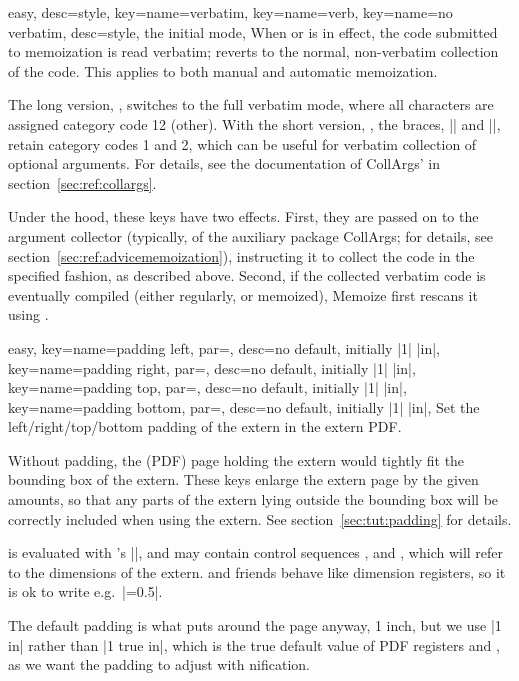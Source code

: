 \documentclass[a4paper,11pt]{article}
\begin{document}
\begin{doc}{easy,
    desc={style},
    key={name=verbatim},
    key={name=verb},
    key={name=no verbatim, desc={style, the initial mode}},
  }
  When  or  is in effect, the code submitted to
  memoization is read verbatim;  reverts to the normal,
  non-verbatim collection of the code.  This applies to both manual and
  automatic memoization.
  
  The long version, , switches to the full verbatim mode,
  where all characters are assigned category code 12 (other).  With the short
  version, , the braces, |{| and |}|, retain category codes 1 and
  2, which can be useful for verbatim collection of optional arguments.  For
  details, see the documentation of CollArgs'  in
  section~\ref{sec:ref:collargs}.

  Under the hood, these keys have two effects. First, they are passed on to the
  argument collector (typically,  of the auxiliary
  package CollArgs; for details, see section~\ref{sec:ref:advicememoization}),
  instructing it to collect the code in the specified fashion, as described
  above.  Second, if the collected verbatim code is eventually compiled (either
  regularly, or memoized), Memoize first rescans it using .
\end{doc}

\begin{doc}{easy,
    key={name=padding left, par=,
      desc={no default, initially |1| |in|}},
    key={name=padding right, par=,
      desc={no default, initially |1| |in|}},
    key={name=padding top, par=,
      desc={no default, initially |1| |in|}},
    key={name=padding bottom, par=,
      desc={no default, initially |1| |in|}},
  }
  Set the left/right/top/bottom padding of the extern in the extern PDF.

  Without padding, the (PDF) page holding the extern would tightly fit the
  bounding box of the extern.  These keys enlarge the extern page by the given
  amounts, so that any parts of the extern lying outside the bounding box will
  be correctly included when using the extern.  See
  section~\ref{sec:tut:padding} for details.

   is evaluated with 's |\dimexpr|, and may
  contain control sequences ,  and
  , which will refer to the dimensions of the extern.
   and friends behave like dimension registers, so it is ok to write
  e.g.\ |=0.5\width|.

  The default padding is what  puts around the page anyway, 1
  inch, but we use |1 in| rather than |1 true in|, which is the true default
  value of PDF registers  and ,
  as we want the padding to adjust with nification.
\end{doc}
\end{document}
